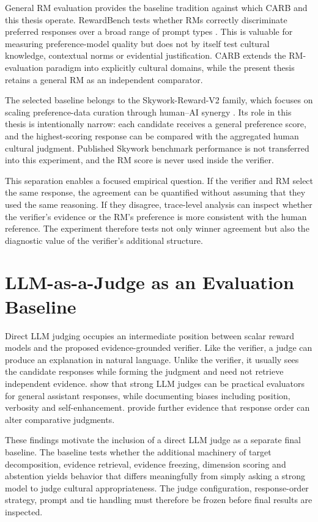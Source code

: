 General RM evaluation provides the baseline tradition against which CARB and this thesis operate. RewardBench tests whether RMs correctly discriminate preferred responses over a broad range of prompt types \parencite{lambert2025rewardbench}. This is valuable for measuring preference-model quality but does not by itself test cultural knowledge, contextual norms or evidential justification. CARB extends the RM-evaluation paradigm into explicitly cultural domains, while the present thesis retains a general RM as an independent comparator.

The selected baseline belongs to the Skywork-Reward-V2 family, which focuses on scaling preference-data curation through human--AI synergy \parencite{liu2026skyworkrewardv2}. Its role in this thesis is intentionally narrow: each candidate receives a general preference score, and the highest-scoring response can be compared with the aggregated human cultural judgment. Published Skywork benchmark performance is not transferred into this experiment, and the RM score is never used inside the verifier.

This separation enables a focused empirical question. If the verifier and RM select the same response, the agreement can be quantified without assuming that they used the same reasoning. If they disagree, trace-level analysis can inspect whether the verifier's evidence or the RM's preference is more consistent with the human reference. The experiment therefore tests not only winner agreement but also the diagnostic value of the verifier's additional structure.

\section{LLM-as-a-Judge as an Evaluation Baseline}

Direct LLM judging occupies an intermediate position between scalar reward models and the proposed evidence-grounded verifier. Like the verifier, a judge can produce an explanation in natural language. Unlike the verifier, it usually sees the candidate responses while forming the judgment and need not retrieve independent evidence. \textcite{zheng2023llmjudge} show that strong LLM judges can be practical evaluators for general assistant responses, while documenting biases including position, verbosity and self-enhancement. \textcite{wang2024notfairevaluators} provide further evidence that response order can alter comparative judgments.

These findings motivate the inclusion of a direct LLM judge as a separate final baseline. The baseline tests whether the additional machinery of target decomposition, evidence retrieval, evidence freezing, dimension scoring and abstention yields behavior that differs meaningfully from simply asking a strong model to judge cultural appropriateness. The judge configuration, response-order strategy, prompt and tie handling must therefore be frozen before final results are inspected.

